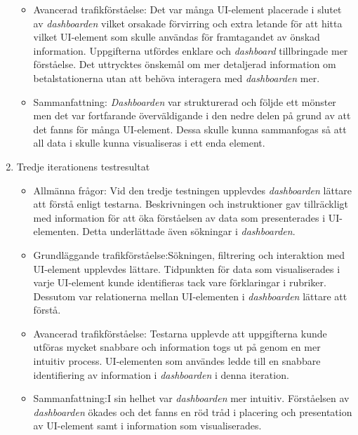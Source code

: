 \documentclass[12pt]{kththesis}
\begin{document}
\begin{enumerate}
\begin{itemize}
\item Avancerad trafikförståelse: Det var många UI-element placerade i slutet av \textit{dashboarden} vilket orsakade förvirring och extra letande för att hitta vilket UI-element som skulle användas för framtagandet av önskad information. Uppgifterna utfördes enklare och \textit{dashboard} tillbringade mer förståelse. Det uttrycktes önskemål om mer detaljerad information om betalstationerna utan att behöva interagera med \textit{dashboarden} mer.

\item Sammanfattning: \textit{Dashboarden} var strukturerad och följde ett mönster men det var fortfarande överväldigande i den nedre delen på grund av att det fanns för många UI-element. Dessa skulle kunna sammanfogas så att all data i skulle kunna visualiseras i ett enda element.
\end{itemize}

\item Tredje iterationens testresultat 

\begin{itemize}
\item Allmänna frågor: Vid den tredje testningen upplevdes \textit{dashboarden} lättare att förstå enligt testarna. Beskrivningen och instruktioner gav tillräckligt med information för att öka förståelsen av data som presenterades i UI-elementen. Detta underlättade även sökningar i \textit{dashboarden}. 

\item   Grundläggande trafikförståelse:Sökningen, filtrering och interaktion med UI-element upplevdes lättare. Tidpunkten för data som visualiserades i varje UI-element kunde identifieras tack vare förklaringar i rubriker. Dessutom var relationerna mellan UI-elementen i \textit{dashboarden} lättare att förstå.

\item Avancerad trafikförståelse: Testarna upplevde att uppgifterna kunde utföras mycket snabbare och information togs ut på genom en mer intuitiv process. UI-elementen som användes ledde till en snabbare identifiering av information i \textit{dashboarden} i denna iteration. 

\item Sammanfattning:I sin helhet var \textit{dashboarden} mer intuitiv. Förståelsen av \textit{dashboarden} ökades och det fanns en röd tråd i placering och presentation av UI-element samt i information som visualiserades. 
\end{itemize}
\end{enumerate}
\end{document}
